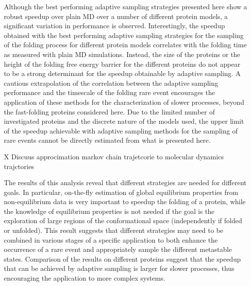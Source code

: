 Although the best performing adaptive sampling strategies presented here show a
robust speedup over plain MD over a number of different protein models, a significant
variation in performance is observed. Interestingly, the
speedup obtained with the best performing adaptive sampling strategies for
the sampling of the folding process for different protein models correlates
with the folding time as measured with plain MD simulations.
Instead, the size of the proteins or the height of the folding free energy
barrier for the different proteins do not appear to be a strong determinant for
the speedup obtainable by adaptive sampling.
A cautious extrapolation of the correlation between the adaptive sampling
performance and the timescale of the folding rare event encourages the
application of these methods for the characterization of slower processes,
beyond the fast-folding proteins considered here. Due to the limited
number of investigated proteins and the discrete nature of the models used,
the upper limit of the speedup achievable with adaptive sampling methods
for the sampling of rare events cannot be directly estimated from what is
presented here.



X Discuus approcimation markov chain trajetcorie to molecular dynamics trajctories 



The results of this analysis reveal that different strategies are needed
for different goals. In particular, on-the-fly estimation of global
equilibrium properties from non-equilibrium data is very important to speedup
the folding of a protein, while the knowledge of equilibrium properties is not
needed if the goal is the exploration of large regions of the conformational
space (independently if folded or unfolded). This result suggests that
different strategies may need to
be combined in various stages of a specific application to both enhance the
occurrence of a rare event and appropriately sample the different metastable states.
Comparison of the results on different proteins
suggest that the speedup that can be achieved by adaptive sampling is larger
for slower processes, thus encouraging the application to more complex systems.
